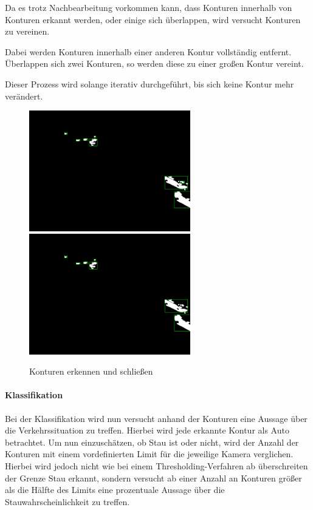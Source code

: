 Da es trotz Nachbearbeitung vorkommen kann, dass Konturen innerhalb von Konturen erkannt werden, oder einige sich überlappen, wird versucht Konturen zu vereinen.

Dabei werden Konturen innerhalb einer anderen Kontur vollständig entfernt. Überlappen sich zwei Konturen, so werden diese zu einer großen Kontur vereint.

Dieser Prozess wird solange iterativ durchgeführt, bis sich keine Kontur mehr verändert.

\begin{figure}[ht]
   \centering
     \includegraphics[width=7cm]{Bilder/process/5_1}
		 \includegraphics[width=7cm]{Bilder/process/5_2} \\
 \caption{Konturen erkennen und schließen}
\end{figure}

\paragraph*{Klassifikation}
Bei der Klassifikation wird nun versucht anhand der Konturen eine Aussage über die Verkehrssituation zu treffen.
Hierbei wird jede erkannte Kontur als Auto betrachtet.
Um nun einzuschätzen, ob Stau ist oder nicht, wird der Anzahl der Konturen mit einem vordefinierten Limit für die jeweilige Kamera verglichen. Hierbei wird jedoch nicht wie bei einem Thresholding-Verfahren ab überschreiten der Grenze Stau erkannt, sondern versucht ab einer Anzahl an Konturen größer als die Hälfte des Limits eine prozentuale Aussage über die Stauwahrscheinlichkeit zu treffen.

